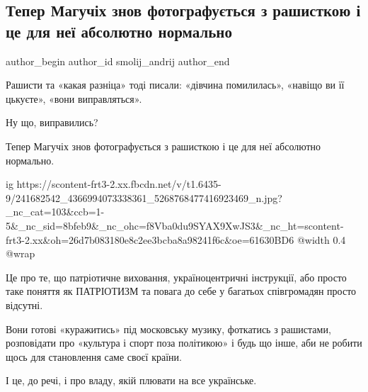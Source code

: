  
 
 
 
 
 
\subsection{Тепер Магучіх знов фотографується з рашисткою і це для неї абсолютно нормально}
\label{sec:09_09_2021.fb.smolij_andrij.1.maguchih_lasickene_snova}
 
\ifcmt
 author_begin
   author_id smolij_andrij
 author_end
\fi

Рашисти та «какая разніца» тоді писали: «дівчина помилилась», «навіщо ви її
цькуєте», «вони виправляться». 

Ну що, виправились? 

Тепер Магучіх знов фотографується з рашисткою і це для неї абсолютно нормально.

\ifcmt
  ig https://scontent-frt3-2.xx.fbcdn.net/v/t1.6435-9/241682542_4366994073338361_5268768477416923469_n.jpg?_nc_cat=103&ccb=1-5&_nc_sid=8bfeb9&_nc_ohc=f8Vba0du9SYAX9XwJS3&_nc_ht=scontent-frt3-2.xx&oh=26d7b083180e8c2ee3bcba8a98241f6c&oe=61630BD6
  @width 0.4
  @wrap 
\fi

Це про те, що патріотичне виховання, україноцентричні інструкції, або просто
таке поняття як ПАТРІОТИЗМ та повага до себе у багатьох співгромадян просто
відсутні. 

Вони готові «куражитись» під московську музику, фоткатись з рашистами,
розповідати про «культура і спорт поза політикою» і будь що інше, аби не робити
щось для становлення саме своєї країни. 

І це, до речі, і про владу, якій плювати на все українське.
